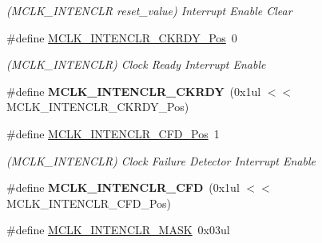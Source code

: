 \begin{DoxyCompactItemize}
\begin{DoxyCompactList}\small\item\em (M\+C\+L\+K\+\_\+\+I\+N\+T\+E\+N\+C\+L\+R reset\+\_\+value) Interrupt Enable Clear \end{DoxyCompactList}\item 
\hypertarget{group___s_a_m_l21___m_c_l_k_gaebdcc599e953e54697b2e40b5397496b}{}\#define \hyperlink{group___s_a_m_l21___m_c_l_k_gaebdcc599e953e54697b2e40b5397496b}{M\+C\+L\+K\+\_\+\+I\+N\+T\+E\+N\+C\+L\+R\+\_\+\+C\+K\+R\+D\+Y\+\_\+\+Pos}~0\label{group___s_a_m_l21___m_c_l_k_gaebdcc599e953e54697b2e40b5397496b}

\begin{DoxyCompactList}\small\item\em (M\+C\+L\+K\+\_\+\+I\+N\+T\+E\+N\+C\+L\+R) Clock Ready Interrupt Enable \end{DoxyCompactList}\item 
\hypertarget{group___s_a_m_l21___m_c_l_k_ga949276193ac8d97d0202ec75f9e84e8f}{}\#define {\bfseries M\+C\+L\+K\+\_\+\+I\+N\+T\+E\+N\+C\+L\+R\+\_\+\+C\+K\+R\+D\+Y}~(0x1ul $<$$<$ M\+C\+L\+K\+\_\+\+I\+N\+T\+E\+N\+C\+L\+R\+\_\+\+C\+K\+R\+D\+Y\+\_\+\+Pos)\label{group___s_a_m_l21___m_c_l_k_ga949276193ac8d97d0202ec75f9e84e8f}

\item 
\hypertarget{group___s_a_m_l21___m_c_l_k_gabe9f1c5b598246291d4cb19527ea3ef4}{}\#define \hyperlink{group___s_a_m_l21___m_c_l_k_gabe9f1c5b598246291d4cb19527ea3ef4}{M\+C\+L\+K\+\_\+\+I\+N\+T\+E\+N\+C\+L\+R\+\_\+\+C\+F\+D\+\_\+\+Pos}~1\label{group___s_a_m_l21___m_c_l_k_gabe9f1c5b598246291d4cb19527ea3ef4}

\begin{DoxyCompactList}\small\item\em (M\+C\+L\+K\+\_\+\+I\+N\+T\+E\+N\+C\+L\+R) Clock Failure Detector Interrupt Enable \end{DoxyCompactList}\item 
\hypertarget{group___s_a_m_l21___m_c_l_k_ga9b2b66665b06ed25e598789c4a9f5b7b}{}\#define {\bfseries M\+C\+L\+K\+\_\+\+I\+N\+T\+E\+N\+C\+L\+R\+\_\+\+C\+F\+D}~(0x1ul $<$$<$ M\+C\+L\+K\+\_\+\+I\+N\+T\+E\+N\+C\+L\+R\+\_\+\+C\+F\+D\+\_\+\+Pos)\label{group___s_a_m_l21___m_c_l_k_ga9b2b66665b06ed25e598789c4a9f5b7b}

\item 
\hypertarget{group___s_a_m_l21___m_c_l_k_ga6389053110a48b3e28a1856e9379af38}{}\#define \hyperlink{group___s_a_m_l21___m_c_l_k_ga6389053110a48b3e28a1856e9379af38}{M\+C\+L\+K\+\_\+\+I\+N\+T\+E\+N\+C\+L\+R\+\_\+\+M\+A\+S\+K}~0x03ul\label{group___s_a_m_l21___m_c_l_k_ga6389053110a48b3e28a1856e9379af38}


\end{DoxyCompactItemize}
